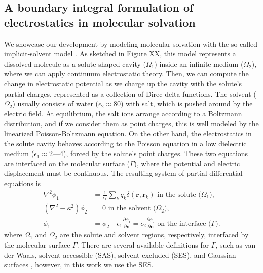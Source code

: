 \subsection{A boundary integral formulation of electrostatics in molecular solvation}

We showcase our development by modeling molecular solvation with the so-called implicit-solvent model \cite{RouxSimonson1999,DescherchiETal2015}. 
As sketched in Figure XX, this model represents a dissolved molecule as a solute-shaped cavity ($\Omega_1$) inside an infinite medium ($\Omega_2$), where we can apply continuum electrostatic theory.
Then, we can compute the change in electrostatic potential as we charge up the cavity with the solute's partial charges, represented as a collection of Direc-delta functions.
The solvent ($\Omega_2$) usually consists of water ($\epsilon_2\approx$80) with salt, which is pushed around by the electric field. 
At equilibrium, the salt ions arrange according to a Boltzmann distribution, and if we consider them as point charges, this is well modeled by the linearized Poisson-Boltzmann equation. 
On the other hand, the electrostatics in the solute cavity behaves according to the Poisson equation in a low dielectric medium ($\epsilon_1\approx$2---4), forced by the solute's point charges.
These two equations are interfaced on the molecular surface ($\Gamma$), where the potential and electric displacement must be continuous.
The resulting system of partial differential equations is
%
\begin{align} \label{eq:pde}
\nabla^2\phi_1 &= \frac{1}{\epsilon_1}\sum_k q_k\delta(\mathbf{r},\mathbf{r}_k) \text{ in the solute ($\Omega_1$),}\nonumber\\
(\nabla^2-\kappa^2)\phi_2 &= 0 \text{ in the solvent ($\Omega_2$),}\nonumber\\
\phi_1 &= \phi_2 \quad \epsilon_1\frac{\partial \phi_1}{\partial\mathbf{n}} = \epsilon_2\frac{\partial \phi_2}{\partial\mathbf{n}} \text{ on the interface ($\Gamma$)}.
\end{align}
%
where $\Omega_1$ and $\Omega_2$ are the solute and solvent regions, respectively, interfaced by the molecular surface $\Gamma$.
There are several available definitions for $\Gamma$, such as van der Waals, solvent accessible (SAS), solvent excluded (SES), and Gaussian surfaces \cite{HarrisFenley2013}, however, in this work we use the SES.

